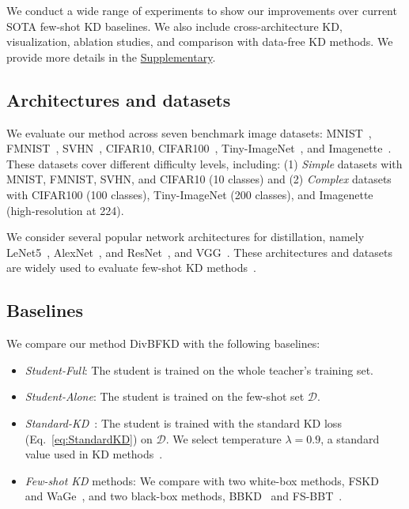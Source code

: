 \begin{foldable}
  We conduct a wide range of experiments to show our improvements over current SOTA few-shot KD baselines.
  We also include cross-architecture KD, visualization, ablation studies, and comparison with data-free KD methods.
  We provide more details in the \hyperref[sec:supp]{Supplementary}.
\end{foldable}

\subsection{Architectures and datasets}
\begin{foldable}
  We evaluate our method across seven benchmark image datasets: MNIST~\cite{lecun2002gradient}, FMNIST~\cite{xiao2017fashion}, SVHN~\cite{netzer2011reading}, CIFAR10, CIFAR100~\cite{krizhevsky2009learning}, Tiny-ImageNet~\cite{le2015tiny}, and Imagenette~\cite{howard2020imagenette}.
  These datasets cover different difficulty levels, including: (1) \textit{Simple} datasets with MNIST, FMNIST, SVHN, and CIFAR10 (10 classes) and (2) \textit{Complex} datasets with CIFAR100 (100 classes), Tiny-ImageNet (200 classes), and Imagenette (high-resolution at 224).
\end{foldable}

\begin{foldable}
  We consider several popular network architectures for distillation, namely LeNet5~\cite{lecun2002gradient}, AlexNet~\cite{krizhevsky2012imagenet}, and ResNet~\cite{he2016deep}, and VGG~\cite{simonyan2014very}.
  These architectures and datasets are widely used to evaluate few-shot KD methods~\cite{kimura2018few,wang2020neural,nguyen2022black}.
\end{foldable}

\subsection{Baselines}
\begin{foldable}
  We compare our method DivBFKD with the following baselines:
  \begin{itemize}
    \item \textit{Student-Full}: The student is trained on the whole teacher's training set.
    \item \textit{Student-Alone}: The student is trained on the few-shot set $\mathcal{D}$.
    \item {
        \textit{Standard-KD}~\cite{hinton2015distilling}: The student is trained with the standard KD loss (Eq.~\ref{eq:StandardKD}) on $\mathcal{D}$.
        We select temperature $\lambda=0.9$, a standard value used in KD methods~\cite{hinton2015distilling,tian2020contrastive,yuan2020revisiting,ma2021undistillable}.
      }
    \item \textit{Few-shot KD} methods: We compare with two white-box methods, FSKD~\cite{kimura2018few} and WaGe~\cite{kong2020learning}, and two black-box methods, BBKD~\cite{wang2020neural} and FS-BBT~\cite{nguyen2022black}.
  \end{itemize}
\end{foldable}

